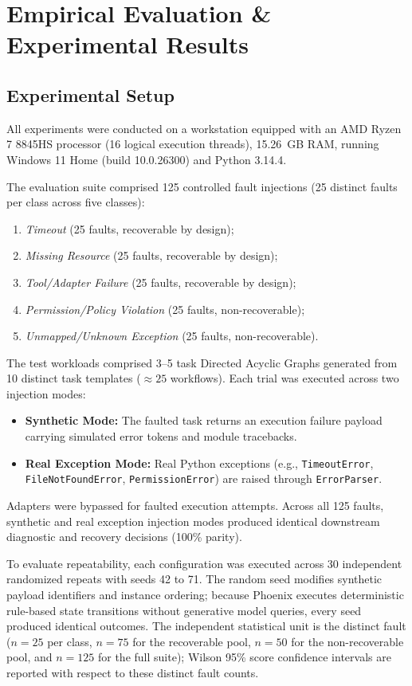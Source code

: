 \documentclass[conference]{IEEEtran}
\newcommand{\chg}[1]{{\color{blue}#1}}
\begin{document}
\section{Empirical Evaluation \& Experimental Results}

\subsection{\chg{Experimental Setup}}
\chg{All experiments were conducted on a workstation equipped with an AMD Ryzen 7 8845HS processor (16 logical execution threads), 15.26~GB RAM, running Windows 11 Home (build 10.0.26300) and Python 3.14.4.} 

\chg{The evaluation suite comprised 125 controlled fault injections (25 distinct faults per class across five classes):}
\begin{enumerate}
    \item \chg{\textit{Timeout} (25 faults, recoverable by design);}
    \item \chg{\textit{Missing Resource} (25 faults, recoverable by design);}
    \item \chg{\textit{Tool/Adapter Failure} (25 faults, recoverable by design);}
    \item \chg{\textit{Permission/Policy Violation} (25 faults, non-recoverable);}
    \item \chg{\textit{Unmapped/Unknown Exception} (25 faults, non-recoverable).}
\end{enumerate}
\chg{The test workloads comprised 3--5 task Directed Acyclic Graphs generated from 10 distinct task templates ($\approx 25$ workflows). Each trial was executed across two injection modes:}
\begin{itemize}
    \item \chg{\textbf{Synthetic Mode:} The faulted task returns an execution failure payload carrying simulated error tokens and module tracebacks.}
    \item \chg{\textbf{Real Exception Mode:} Real Python exceptions (e.g., \texttt{TimeoutError}, \texttt{FileNotFoundError}, \texttt{PermissionError}) are raised through \texttt{ErrorParser}.}
\end{itemize}
\chg{Adapters were bypassed for faulted execution attempts. Across all 125 faults, synthetic and real exception injection modes produced identical downstream diagnostic and recovery decisions (100\% parity).}

\chg{To evaluate repeatability, each configuration was executed across 30 independent randomized repeats with seeds 42 to 71. The random seed modifies synthetic payload identifiers and instance ordering; because Phoenix executes deterministic rule-based state transitions without generative model queries, every seed produced identical outcomes. The independent statistical unit is the distinct fault ($n=25$ per class, $n=75$ for the recoverable pool, $n=50$ for the non-recoverable pool, and $n=125$ for the full suite); Wilson 95\% score confidence intervals are reported with respect to these distinct fault counts.}
\end{document}
